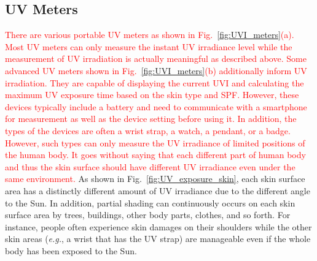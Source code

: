 \documentclass[journal]{IEEEtran}
\begin{document}
\subsection{UV Meters}
\textcolor{red}{There are various portable UV meters as shown in Fig.~\ref{fig:UVI_meters}(a). Most UV meters can only measure the instant UV irradiance level while the measurement of UV irradiation is actually meaningful as described above. Some advanced UV meters shown in Fig.~\ref{fig:UVI_meters}(b) additionally inform UV irradiation. They are capable of displaying the current  UVI and calculating the maximum UV exposure time based on the skin type and SPF. However, these devices typically include a battery and need to communicate with a smartphone~\cite{Netatmo, Ultra} for measurement as well as the device setting before using it. In addition, the types of the devices are often a wrist strap, a watch, a pendant, or a badge. However, such types can only measure the UV irradiance of limited positions of the human body. It goes without saying that each different part of human body and thus the skin surface should have different UV irradiance even under the same environment.} 
%
As shown in Fig.~\ref{fig:UV_exposure_skin}, each skin surface area has a distinctly different amount of UV irradiance due to the different angle to the Sun. In addition, partial shading can continuously occurs on each skin surface area by trees, buildings, other body parts, clothes, and so forth. For instance, people often experience skin damages on their shoulders while the other skin areas (\textit{e.g.}, a wrist that has the UV strap) are manageable even if the whole body has been exposed to the Sun.
\end{document}
